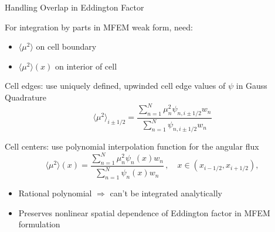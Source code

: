 \documentclass[10pt]{beamer}
\newcommand{\edd}{\langle \mu^2 \rangle}
\begin{document}





% 		


\begin{frame}{Handling Overlap in Eddington Factor}

	For integration by parts in MFEM weak form, need:
	\begin{itemize}
		\item $\edd$ on cell boundary 
		\item $\edd(x)$ on interior of cell 
	\end{itemize}

	Cell edges: use \alert{uniquely defined, upwinded} cell edge values of $\psi$ in Gauss Quadrature 
	\begin{equation*} \label{lldg:edde}
		\edd_{i\pm 1/2} = \frac{
			\sum_{n=1}^N \mu_n^2 \psi_{n,i\pm 1/2} w_n
		}{
			\sum_{n=1}^N \psi_{n,i\pm 1/2} w_n 
		} 
	\end{equation*}

	Cell centers: use polynomial interpolation function for the angular flux 
	\begin{equation*} \label{lldg:eddi}
			\edd(x) = \frac{
				\sum_{n=1}^N \mu_n^2 \psi_{n}(x) w_n
			}{
				\sum_{n=1}^N \psi_{n}(x) w_n 
			} \,, \quad x\in(x_{i-1/2},x_{i+1/2}),
		\end{equation*}

	\begin{itemize}
		\item Rational polynomial $\Rightarrow$ can't be integrated analytically 

		\item Preserves nonlinear spatial dependence of Eddington factor in MFEM formulation 

	\end{itemize}

\end{frame}
\end{document}
